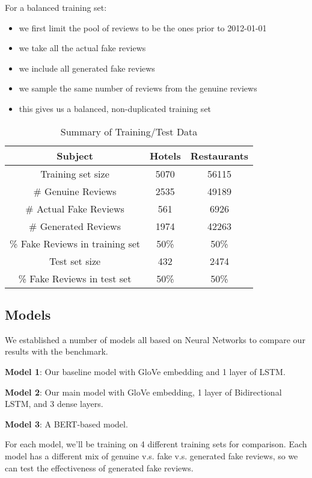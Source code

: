 \documentclass[conference, 11pt]{IEEEtran} %
\theoremstyle{plain}
\theoremstyle{definition}
\begin{document}
For a balanced training set:
\begin{itemize}
\setlength\itemsep{0em}
\item we first limit the pool of reviews to be the ones prior to 2012-01-01
\item we take all the actual fake reviews
\item we include all generated fake reviews
\item we sample the same number of reviews from the genuine reviews
\item this gives us a balanced, non-duplicated training set
\end{itemize}


\begin{table}[h!]
\small
\caption{Summary of Training/Test Data}
\centering
\begin{tabular}{|c|c|c|}
\hline
Subject & Hotels & Restaurants \\ \hline
Training set size & 5070 & 56115 \\ \hline
\# Genuine Reviews & 2535  & 49189 \\ \hline
\# Actual Fake Reviews & 561  &  6926\\ \hline
\# Generated Reviews & 1974 & 42263 \\ \hline
\% Fake Reviews in training set & 50\% & 50\%  \\ \hline
Test set size & 432 & 2474 \\ \hline
\% Fake Reviews in test set & 50\% & 50\% \\ 
\hline
\end{tabular}
\label{trainining-data}

\end{table}

\subsection{Models}
We established a number of models all based on Neural Networks to compare our results with the benchmark.

\textbf{Model 1}: Our baseline model with GloVe embedding and 1 layer of LSTM.

\textbf{Model 2}: Our main model with GloVe embedding, 1 layer of Bidirectional LSTM, and 3 dense layers.

\textbf{Model 3}: A BERT-based model.

For each model, we'll be training on 4 different training sets for comparison. Each model has a different mix of genuine v.s. fake v.s. generated fake reviews, so we can test the effectiveness of generated fake reviews.
\end{document}
